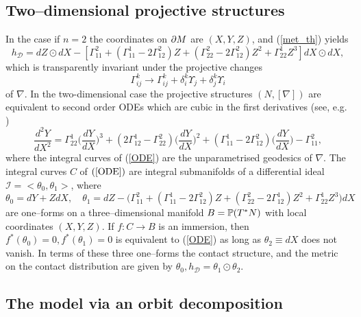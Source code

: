 \koniec

\subsection{Two--dimensional projective structures}
In the case if $n=2$ the coordinates on $\partial M$ are $(X, Y, Z)$,  and (\ref{met_th}) yields
\[
h_{\mathcal D}=dZ\odot dX-[\Gamma_{11}^2+(\Gamma_{11}^1-2\Gamma_{12}^2)Z+(\Gamma_{22}^2-2\Gamma_{12}^2)Z^2+
\Gamma_{22}^1Z^3]dX\odot dX,
\]
which is transparently invariant under the projective changes 
\[
\Gamma_{ij}^k\longrightarrow \Gamma_{ij}^k+\delta^k_i\Upsilon_j+\delta^k_j\Upsilon_i
\]
of $\nabla$.
In the  two-dimensional case the 
projective
structures $(N, [\nabla])$ are equivalent to second order ODEs which are cubic in
the first derivatives (see, e.g. \cite{BDE})
\begin{equation}
\label{ODE}
\frac{d^2 Y}{d X^2}=\Gamma^1_{22}\Big(\frac{d Y}{d X}\Big)^3
+(2\Gamma^1_{12}-\Gamma^2_{22})\Big(\frac{d Y}{d X}\Big)^2
+(\Gamma^1_{11}-2\Gamma^2_{12})\Big(\frac{d Y}{d X}\Big)-
\Gamma^2_{11},
\end{equation}
where the integral curves of (\ref{ODE}) are the unparametrised geodesics of $\nabla$. 
The integral curves $C$ of $(\ref{ODE})$ are integral submanifolds
of a  differential
ideal ${\mathcal I}=<\theta_0, \theta_1>$, where
\[
\theta_0=dY+ZdX, \quad \theta_1=dZ-\Big(\Gamma_{11}^2+(\Gamma_{11}^1-2\Gamma_{12}^2)Z+(\Gamma_{22}^2-2\Gamma_{12}^1)Z^2+
\Gamma_{22}^1Z^3\Big)dX
\]
are one--forms on a three--dimensional manifold $B=\mathbb{P}(T^*N)$ with local coordinates $(X, Y, Z)$. If $f:C\rightarrow B$ is an immersion, then $f^*(\theta_0)=0, f^*(\theta_1)=0$ is equivalent
to (\ref{ODE}) as long as $\theta_2\equiv dX$ does not vanish. In terms of these three one--forms
the contact structure, and the metric on the contact distribution are given by
$
\theta_0,  h_{\mathcal D}=\theta_1\odot\theta_2.
$



\subsection{The model via an orbit decomposition}

